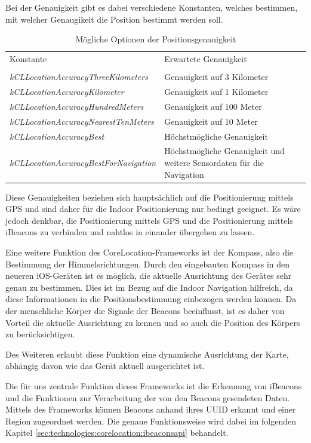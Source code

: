 Bei der Genauigkeit gibt es dabei verschiedene Konstanten, welches bestimmen, mit welcher Genaugikeit die Position bestimmt werden soll. 


    \begin{table}[htb!]
      \centering
      \begin{tabular}{l p{6cm}}
        Konstante & Erwartete Genauigkeit \\ \\
		\emph{kCLLocationAccuracyThreeKilometers} & Genauigkeit auf 3 Kilometer \\
		\emph{kCLLocationAccuracyKilometer} & Genauigkeit auf 1 Kilometer \\
		\emph{kCLLocationAccuracyHundredMeters} & Genauigkeit auf 100 Meter \\
		\emph{kCLLocationAccuracyNearestTenMeters} & Genauigkeit auf 10 Meter \\
		\emph{kCLLocationAccuracyBest} & Höchstmögliche Genauigkeit \\
		\emph{kCLLocationAccuracyBestForNavigation} & Höchstmögliche Genauigkeit und weitere Sensordaten für die Navigation
      \end{tabular}
      \caption{Mögliche Optionen der Positionsgenauigkeit}
      \label{tbl:positionaccuracy}
    \end{table}
	
Diese Genauigkeiten beziehen sich hauptsächlich auf die Positionierung mittels GPS und sind daher für die Indoor Positionierung nur bedingt geeignet. Es wäre jedoch denkbar, die Positionierung mittels GPS und die Positionierung mittels iBeacons zu verbinden und nahtlos in einander übergehen zu lassen.

Eine weitere Funktion des CoreLocation-Frameworks ist der Kompass, also die Bestimmung der Himmelsrichtungen. Durch den eingebauten Kompass in den neueren iOS-Geräten ist es möglich, die aktuelle Ausrichtung des Gerätes sehr genau zu bestimmen. Dies ist im Bezug auf die Indoor Navigation hilfreich, da diese Informationen in die Positionsbestimmung einbezogen werden können. Da der menschliche Körper die Signale der Beacons beeinflusst, ist es daher von Vorteil die aktuelle Ausrichtung zu kennen und so auch die Position des Körpers zu berücksichtigen.

Des Weiteren erlaubt diese Funktion eine dynamische Ausrichtung der Karte, abhängig davon wie das Gerät aktuell ausgerichtet ist.

Die für uns zentrale Funktion dieses Frameworks ist die Erkennung von iBeacons und die Funktionen zur Verarbeitung der von den Beacons gesendeten Daten.
Mittels des Frameworks können Beacons anhand ihres UUID erkannt und einer Region zugeordnet werden. Die genaue Funktionsweise wird dabei im folgenden Kapitel \ref{sec:technologies:corelocation:ibeaconsapi} behandelt.

